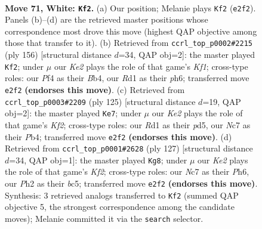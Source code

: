 \documentclass[11pt]{article}
\begin{document}
\clearpage

\begin{figure}[p]\centering
\begin{subfigure}{0.46\textwidth}\centering
\resizebox{\linewidth}{!}{%
\newchessgame
\chessboard[
  setfen={8/PbN5/5k2/n7/1p3P2/6PB/4K2P/3R4 w - - 10 71},
  showmover=false,
  pgfstyle=straightmove, color=movearrow, markmove={e2-f2}
]}
\caption{}
\end{subfigure}\hfill
\begin{subfigure}{0.46\textwidth}\centering
\resizebox{\linewidth}{!}{%
\newchessgame
\chessboard[
  setfen={8/P1N2k2/2b4p/8/1BPn4/8/8/5K2 w - - 2 79},
  showmover=false,
  pgfstyle=straightmove, color=movearrow, markmove={f1-f2}
]}
\caption{}
\end{subfigure}
\\[4pt]
\begin{subfigure}{0.46\textwidth}\centering
\resizebox{\linewidth}{!}{%
\newchessgame
\chessboard[
  setfen={8/5k2/8/3P2p1/1pn1p3/pN5P/5K2/B7 b - - 1 63},
  showmover=false,
  pgfstyle=straightmove, color=movearrow, markmove={f7-e7}
]}
\caption{}
\end{subfigure}\hfill
\begin{subfigure}{0.46\textwidth}\centering
\resizebox{\linewidth}{!}{%
\newchessgame
\chessboard[
  setfen={8/5kp1/7p/2Bn1K2/2b4P/8/2B3P1/8 b - - 10 64},
  showmover=false,
  pgfstyle=straightmove, color=movearrow, markmove={f7-g8}
]}
\caption{}
\end{subfigure}
\caption{\textbf{Move 71, White: \texttt{Kf2}.} (a) Our position; Melanie plays \texttt{Kf2} (\texttt{e2f2}). Panels (b)--(d) are the retrieved master positions whose correspondence most drove this move (highest QAP objective among those that transfer to it). (b) Retrieved from \texttt{ccrl\_top\_p0002\#2215} (ply 156) [structural distance $d$=34, QAP obj=2]: the master played \texttt{Kf2}; under $\mu$ our \emph{Ke2} plays the role of that game's \emph{Kf1}; cross-type roles: our \emph{P}f4 as their \emph{B}b4, our \emph{R}d1 as their \emph{p}h6; transferred move \texttt{e2f2} \textbf{(endorses this move)}. (c) Retrieved from \texttt{ccrl\_top\_p0003\#2209} (ply 125) [structural distance $d$=19, QAP obj=2]: the master played \texttt{Ke7}; under $\mu$ our \emph{Ke2} plays the role of that game's \emph{Kf2}; cross-type roles: our \emph{R}d1 as their \emph{p}d5, our \emph{N}c7 as their \emph{P}b4; transferred move \texttt{e2f2} \textbf{(endorses this move)}. (d) Retrieved from \texttt{ccrl\_top\_p0001\#2628} (ply 127) [structural distance $d$=34, QAP obj=1]: the master played \texttt{Kg8}; under $\mu$ our \emph{Ke2} plays the role of that game's \emph{Kf2}; cross-type roles: our \emph{N}c7 as their \emph{P}h6, our \emph{P}h2 as their \emph{b}c5; transferred move \texttt{e2f2} \textbf{(endorses this move)}. Synthesis: 3 retrieved analogs transferred to \texttt{Kf2} (summed QAP objective 5, the strongest correspondence among the candidate moves); Melanie committed it via the \texttt{search} selector.}
\label{fig:thought-m140}
\end{figure}
\end{document}
